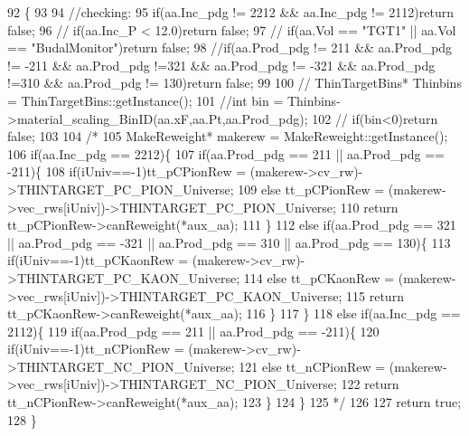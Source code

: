 \begin{DoxyCode}
92                                                                          \{
93 
94     \textcolor{comment}{//checking:}
95     \textcolor{keywordflow}{if}(aa.Inc\_pdg != 2212 && aa.Inc\_pdg != 2112)\textcolor{keywordflow}{return} \textcolor{keyword}{false};
96     \textcolor{comment}{//  if(aa.Inc\_P < 12.0)return false;}
97     \textcolor{comment}{// if(aa.Vol == "TGT1" || aa.Vol == "BudalMonitor")return false;}
98     \textcolor{comment}{//if(aa.Prod\_pdg != 211 && aa.Prod\_pdg != -211 && aa.Prod\_pdg !=321 && aa.Prod\_pdg != -321 &&
       aa.Prod\_pdg !=310 && aa.Prod\_pdg != 130)return false;}
99     
100     \textcolor{comment}{// ThinTargetBins*  Thinbins =  ThinTargetBins::getInstance();}
101     \textcolor{comment}{//int bin = Thinbins->material\_scaling\_BinID(aa.xF,aa.Pt,aa.Prod\_pdg);}
102     \textcolor{comment}{// if(bin<0)return false;}
103     
104     \textcolor{comment}{/*}
105 \textcolor{comment}{      MakeReweight*  makerew =  MakeReweight::getInstance();}
106 \textcolor{comment}{      if(aa.Inc\_pdg == 2212)\{}
107 \textcolor{comment}{      if(aa.Prod\_pdg == 211 || aa.Prod\_pdg == -211)\{}
108 \textcolor{comment}{      if(iUniv==-1)tt\_pCPionRew = (makerew->cv\_rw)->THINTARGET\_PC\_PION\_Universe;}
109 \textcolor{comment}{      else tt\_pCPionRew = (makerew->vec\_rws[iUniv])->THINTARGET\_PC\_PION\_Universe; }
110 \textcolor{comment}{      return tt\_pCPionRew->canReweight(*aux\_aa);}
111 \textcolor{comment}{      \}}
112 \textcolor{comment}{      else if(aa.Prod\_pdg == 321 || aa.Prod\_pdg == -321 || aa.Prod\_pdg == 310 || aa.Prod\_pdg == 130)\{}
113 \textcolor{comment}{      if(iUniv==-1)tt\_pCKaonRew = (makerew->cv\_rw)->THINTARGET\_PC\_KAON\_Universe;}
114 \textcolor{comment}{      else tt\_pCKaonRew = (makerew->vec\_rws[iUniv])->THINTARGET\_PC\_KAON\_Universe;  }
115 \textcolor{comment}{      return tt\_pCKaonRew->canReweight(*aux\_aa);}
116 \textcolor{comment}{      \}}
117 \textcolor{comment}{      \}}
118 \textcolor{comment}{      else if(aa.Inc\_pdg == 2112)\{}
119 \textcolor{comment}{      if(aa.Prod\_pdg == 211 || aa.Prod\_pdg == -211)\{}
120 \textcolor{comment}{      if(iUniv==-1)tt\_nCPionRew = (makerew->cv\_rw)->THINTARGET\_NC\_PION\_Universe;}
121 \textcolor{comment}{      else tt\_nCPionRew = (makerew->vec\_rws[iUniv])->THINTARGET\_NC\_PION\_Universe;}
122 \textcolor{comment}{      return tt\_nCPionRew->canReweight(*aux\_aa);}
123 \textcolor{comment}{      \}      }
124 \textcolor{comment}{      \}}
125 \textcolor{comment}{    */}
126 
127     \textcolor{keywordflow}{return} \textcolor{keyword}{true};
128   \}
\end{DoxyCode}


